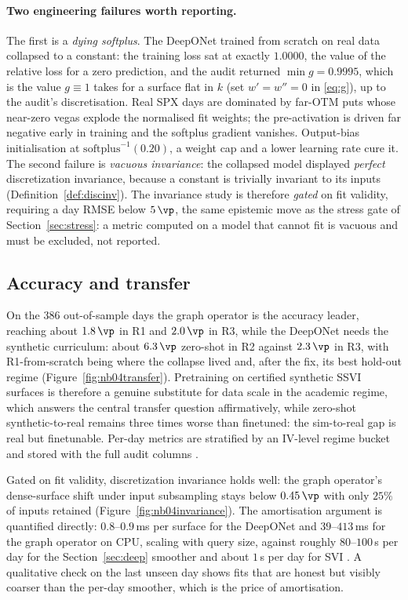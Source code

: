 \paragraph{Two engineering failures worth reporting.} The first is a \emph{dying softplus}.
The DeepONet trained from scratch on real data collapsed to a constant: the training loss sat
at exactly $1.0000$, the value of the relative loss for a zero prediction, and the audit
returned $\min g=0.9995$, which is the value $g\equiv1$ takes for a surface flat in $k$
(set $w'=w''=0$ in \eqref{eq:g}), up to the audit's discretisation. Real SPX days are
dominated by far-OTM puts whose near-zero vegas explode the normalised fit weights; the
pre-activation is driven far negative early in training and the softplus gradient vanishes.
Output-bias initialisation at $\mathrm{softplus}^{-1}(0.20)$, a weight cap and a lower
learning rate cure it. The second failure is \emph{vacuous invariance}: the collapsed model
displayed \emph{perfect} discretization invariance, because a constant is trivially invariant
to its inputs (Definition~\ref{def:discinv}). The invariance study is therefore \emph{gated}
on fit validity, requiring a day RMSE below $5\,\vp$, the same epistemic move as the stress
gate of Section~\ref{sec:stress}: a metric computed on a model that cannot fit is vacuous and
must be excluded, not reported. 

\subsection{Accuracy and transfer}

On the $386$ out-of-sample days the graph operator is the accuracy leader, reaching about
$1.8\,\vp$ in R1 and $2.0\,\vp$ in R3, while the DeepONet needs the synthetic curriculum:
about $6.3\,\vp$ zero-shot in R2 against $2.3\,\vp$ in R3, with R1-from-scratch being where
the collapse lived and, after the fix, its best hold-out regime
(Figure~\ref{fig:nb04transfer}). Pretraining on certified synthetic SSVI surfaces is therefore
a genuine substitute for data scale in the academic regime, which answers the central transfer
question affirmatively, while zero-shot synthetic-to-real remains three times worse than
finetuned: the sim-to-real gap is real but finetunable. Per-day metrics are stratified by an
IV-level regime bucket and stored with the full audit columns
.

Gated on fit validity, discretization invariance holds well: the graph operator's dense-surface
shift under input subsampling stays below $0.45\,\vp$ with only $25\%$ of inputs retained
(Figure~\ref{fig:nb04invariance}). The amortisation argument is quantified directly:
$0.8$--$0.9$\,ms per surface for the DeepONet and $39$--$413$\,ms for the graph operator on
CPU, scaling with query size, against roughly $80$--$100$\,s per day for the
Section~\ref{sec:deep} smoother and about $1$\,s per day for SVI
. A qualitative check on the last unseen day shows fits that
are honest but visibly coarser than the per-day smoother, which is the price of amortisation.

